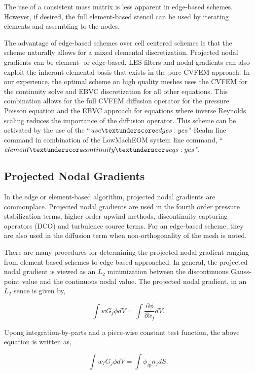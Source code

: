 The use of a consistent mass matrix is less apparent in edge-based
schemes. However, if desired, the full element-based stencil can
be used by iterating elements and assembling to the nodes. 

The advantage of edge-based schemes over cell centered schemes is
that the scheme naturally allows for a mixed elemental discretization. Projected nodal gradients
can be element- or edge-based.  LES
filters and nodal gradients can also exploit the inherant elemental
basis that exists in the pure CVFEM approach. In our experience, the optimal scheme on high quality
meshes uses the CVFEM for the continuity solve and EBVC discretization for all other equations.
This combination allows for the full CVFEM diffusion operator for the pressure Poisson equation
and the EBVC approach for equations where inverse Reynolds scaling reduces the importance of the 
diffusion operator. This scheme can be activated by the use of the ``$use \textunderscore edges: yes$''
Realm line command in combination of the LowMachEOM system line command, 
``$element \textunderscore continuity \textunderscore eqs : yes$''.

\subsection{Projected Nodal Gradients}
In the edge or element-based algorithm, projected nodal gradients
are commonplace. Projected nodal gradients are used in the fourth 
order pressure stabilization terms, higher order upwind methods, discontinuity
capturing operators (DCO) and turbulence source terms. For an edge-based scheme, 
they are also used in the diffusion term when non-orthogonality of the mesh is noted.

There are many procedures for determining the projected 
nodal gradient ranging from element-based schemes to
edge-based approached. In general, the projected nodal gradient is viewed as an $L_2$ 
minimization between the discontinuous Gauss-point value and the continuous
nodal value. The projected nodal gradient, in an $L_2$ sence is given by,

\begin{equation}
\int w G_j \phi {dV} = \int \frac{\partial \phi}{\partial x_j}{dV}.
\label{PNG}
\end{equation}

Upong integration-by-parts and a piece-wise constant test function, the above equation
is written as,

\begin{equation}
\int w_I G_j \phi {dV} = \int \phi_{ip} n_j {dS}.
\label{PNG}
\end{equation}

